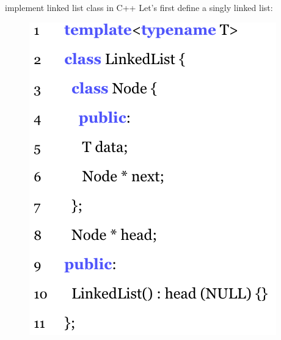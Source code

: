 \documentclass{beamer}
\begin{document}
\begin{frame}{implement linked list class in C++}
    Let's first define a singly linked list:
        \begin{figure}
            \includegraphics[height=0.8\textheight]{code_ll2.png}
    \end{figure}
\end{frame}
\end{document}
